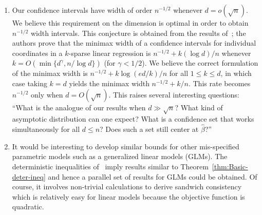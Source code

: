 \documentclass{article}
\begin{document}
\begin{enumerate}
\item Our confidence intervals have width of order $n^{-1/2}$ whenever $d = o(\sqrt{n})$. We believe this requirement on the dimension is optimal in order to obtain $n^{-1/2}$ width intervals. This conjecture is obtained from the results of~\cite{cai2017confidence}; the authors prove that the minimax width of a confidence intervals for individual coordinates in a $k$-sparse linear regression is $n^{-1/2} + k(\log d)/n$ whenever $k = O(\min\{d^{\gamma}, n/\log d\})$ (for $\gamma < 1/2$). We believe the correct formulation of the minimax width is $n^{-1/2} + k\log(ed/k)/n$ for all $1\le k\le d$, in which case taking $k = d$ yields the minimax width $n^{-1/2} + k/n$. This rate becomes $n^{-1/2}$ only when $d = O(\sqrt{n})$. This raises several interesting questions: ``What is the analogue of our results when $d \gg \sqrt{n}$? What kind of asymptotic distribution can one expect? What is a confidence set that works simultaneously for all $d \le n$? Does such a set still center at $\widehat{\beta}$?''
\item It would be interesting to develop similar bounds for
other mis-specified parametric models such as a generalized linear
models (GLMs). The deterministic inequalities of~\cite{2018arXiv180905172K}
imply results similar to Theorem~\ref{thm:Basic-deter-ineq} and hence
a parallel set of results for GLMs could be obtained. Of course, it involves non-trivial calculations to derive sandwich consistency which is
relatively easy for linear models because the objective function is quadratic.
\end{enumerate}
\newpage
\end{document}
